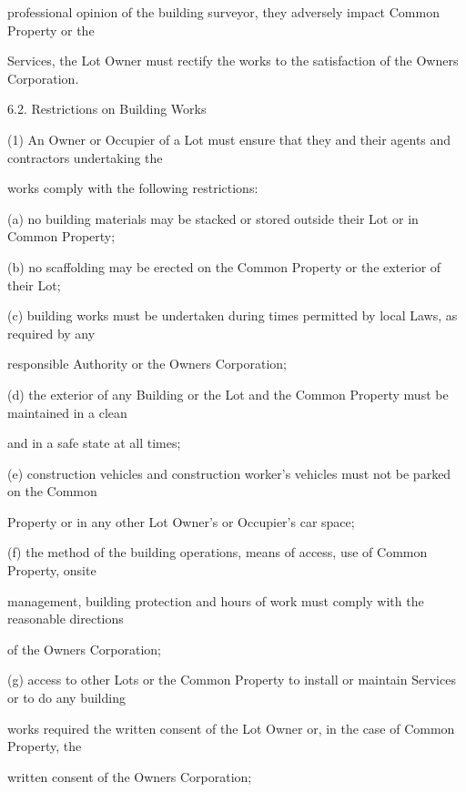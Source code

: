 \documentclass{article}
\begin{document}
{\fontsize{10.02}{1}professional opinion of the building surveyor, they adversely impact Common Property or the }

{\fontsize{10.02}{1}Services, the Lot Owner must rectify the works to the satisfaction of the Owners Corporation. }

{\fontsize{9.99}{1}6.2. Restrictions on Building Works }

{\fontsize{9.962}{1}(1) An Owner or Occupier of a Lot must ensure that they and their agents and contractors undertaking the }

{\fontsize{10.02}{1}works comply with the following restrictions: }

{\fontsize{9.962}{1}(a) no building materials may be stacked or stored outside their Lot or in Common Property; }

{\fontsize{9.962}{1}(b) no scaffolding may be erected on the Common Property or the exterior of their Lot; }

{\fontsize{9.962}{1}(c) building works must be undertaken during times permitted by local Laws, as required by any }

{\fontsize{10.02}{1}responsible Authority or the Owners Corporation; }

{\fontsize{9.962}{1}(d) the exterior of any Building or the Lot and the Common Property must be maintained in a clean }

{\fontsize{10.02}{1}and in a safe state at all times; }

{\fontsize{9.962}{1}(e) construction vehicles and construction worker’s vehicles must not be parked on the Common }

{\fontsize{10.02}{1}Property or in any other Lot Owner’s or Occupier’s car space; }

{\fontsize{9.962}{1}(f) the method of the building operations, means of access, use of Common Property, onsite }

{\fontsize{10.02}{1}management, building protection and hours of work must comply with the reasonable directions }

{\fontsize{10.02}{1}of the Owners Corporation; }

{\fontsize{9.962}{1}(g) access to other Lots or the Common Property to install or maintain Services or to do any building }

{\fontsize{10.02}{1}works required the written consent of the Lot Owner or, in the case of Common Property, the }

{\fontsize{10.02}{1}written consent of the Owners Corporation; }
\end{document}
